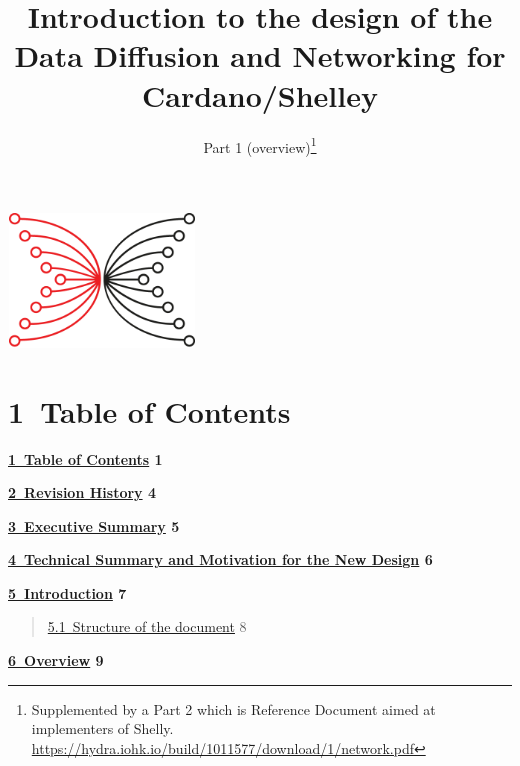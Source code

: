 \documentclass[]{article}
\title{\protect\hypertarget{_3e5zvde5t6qv}{}{}Introduction to the design of the
Data Diffusion and Networking for Cardano/Shelley}
\subtitle{\protect\hypertarget{_yn0mpga1mrx}{}{}Part 1 (overview)\footnote{Supplemented
  by a Part 2 which is Reference Document aimed at implementers of
  Shelly.\\
  \href{https://hydra.iohk.io/build/1011577/download/1/network.pdf}{{https://hydra.iohk.io/build/1011577/download/1/network.pdf}}}}
\date{}
\begin{document}
\maketitle

\includegraphics[width=1.95833in,height=1.40669in]{./media/image3.png}

\hypertarget{table-of-contents}{%
\section{​1​~Table of Contents}\label{table-of-contents}}

\textbf{\protect\hyperlink{table-of-contents}{​1​~Table of Contents} 1}

\textbf{\protect\hyperlink{revision-history}{​2​~Revision History} 4}

\textbf{\protect\hyperlink{executive-summary}{​3​~Executive Summary} 5}

\textbf{\protect\hyperlink{technical-summary-and-motivation-for-the-new-design}{​4​~Technical
Summary and Motivation for the New Design} 6}

\textbf{\protect\hyperlink{introduction}{​5​~Introduction} 7}

\begin{quote}
\protect\hyperlink{structure-of-the-document}{​5.1​~Structure of the
document} 8
\end{quote}

\textbf{\protect\hyperlink{overview}{​6​~Overview} 9}
\end{document}
